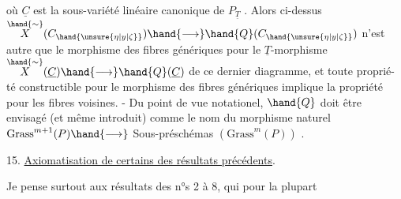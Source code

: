 où $\underline{C}$ est la sous-variété linéaire canonique de $P_{\underline{T}}$ . Alors ci-dessus
$\overset{\hand{\sim}}{X}(C_{\hand{\unsure{\eta|y|\zeta}}}) \hand{\longrightarrow} \hand{Q}(C_{\hand{\unsure{\eta|y|\zeta}}})$ n'est autre que le morphisme des fibres génériques pour
le $\underline{T}$-morphisme $\overset{\hand{\sim}}{X}(\underline{C}) \hand{\longrightarrow} \hand{Q}(\underline{C})$ de ce dernier diagramme, et toute propri\'e-%
té constructible pour  le morphisme des fibres génériques implique
la propriété pour les fibres voisines. - Du point de vue notationel,
$\hand{Q}$ doit être envisagé (et même introduit) comme le nom du morphisme 
naturel $\mathrm{Grass}^{m+1}(P) \hand{\longrightarrow}$  Sous-préschémas $(\mathrm{Grass}^{m}(P))$ .

15. \uline{Axiomatisation de certains des résultats précédents}.

Je pense surtout aux résultats des n°s 2 à 8, qui pour la plupart

